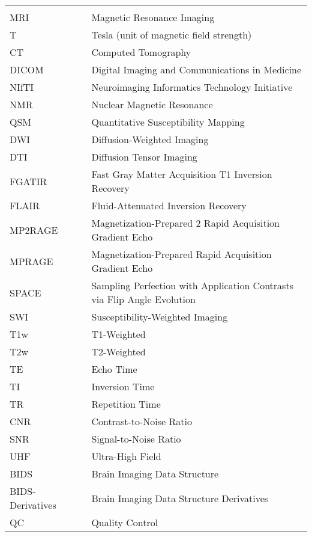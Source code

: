 \documentclass[hidelinks,12pt,oneside]{report}
\numberwithin{figure}{chapter}
\newenvironment{preliminary}%
{\pagestyle{plain}\pagenumbering{roman}}%
{\pagenumbering{arabic}}
\begin{document}
\begin{preliminary}
\begin{longtable}{lll}
\addlinespace[1ex]
\multicolumn{3}{l}{\textbf{Medical Imaging Terminology}} \\
MRI & & Magnetic Resonance Imaging \\
T & & Tesla (unit of magnetic field strength) \\
CT & & Computed Tomography \\
DICOM & & Digital Imaging and Communications in Medicine \\
NIfTI & & Neuroimaging Informatics Technology Initiative \\
NMR & & Nuclear Magnetic Resonance \\
QSM & & Quantitative Susceptibility Mapping \\
DWI & & Diffusion-Weighted Imaging \\
DTI & & Diffusion Tensor Imaging \\
FGATIR & & Fast Gray Matter Acquisition T1 Inversion Recovery \\
FLAIR & & Fluid-Attenuated Inversion Recovery \\
MP2RAGE & & Magnetization-Prepared 2 Rapid Acquisition Gradient Echo \\
MPRAGE & & Magnetization-Prepared Rapid Acquisition Gradient Echo \\
SPACE & & Sampling Perfection with Application Contrasts via Flip Angle Evolution \\
SWI & & Susceptibility-Weighted Imaging \\
T1w & & T1-Weighted \\
T2w & & T2-Weighted \\
TE & & Echo Time \\
TI & & Inversion Time \\
TR & & Repetition Time \\
CNR & & Contrast-to-Noise Ratio \\
SNR & & Signal-to-Noise Ratio \\
UHF & & Ultra-High Field \\
BIDS & & Brain Imaging Data Structure \\
BIDS-Derivatives & & Brain Imaging Data Structure Derivatives \\
QC & & Quality Control \\


\end{longtable}
\end{preliminary}
\end{document}

